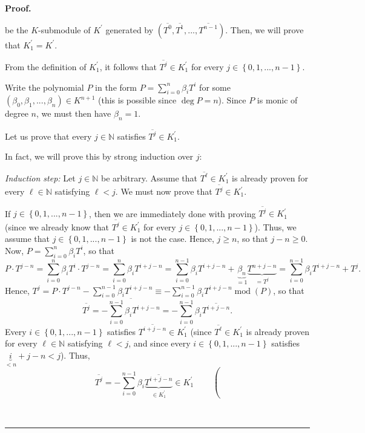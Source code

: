 \documentclass[numbers=enddot,12pt,final,onecolumn,notitlepage]{scrartcl}%
\newenvironment{proof}[1][Proof]{\noindent\textbf{#1.} }{\ \rule{0.5em}{0.5em}}
\begin{document}
\begin{proof}
{be the $K$-submodule of $K^{\prime}$ generated by $\left(  \overline{T^{0}%
},\overline{T^{1}},...,\overline{T^{n-1}}\right)  $. Then, we will prove that
$K_{1}^{\prime}=K^{\prime}$.
\par
From the definition of $K_{1}^{\prime}$, it follows that $\overline{T^{j}}\in
K_{1}^{\prime}$ for every $j\in\left\{  0,1,...,n-1\right\}  $.
\par
Write the polynomial $P$ in the form $P=\sum\limits_{i=0}^{n}\beta_{i}T^{i}$
for some $\left(  \beta_{0},\beta_{1},...,\beta_{n}\right)  \in K^{n+1}$ (this
is possible since $\deg P=n$). Since $P$ is monic of degree $n$, we must then
have $\beta_{n}=1$.
\par
Let us prove that every $j\in\mathbb{N}$ satisfies $\overline{T^{j}}\in
K_{1}^{\prime}$.
\par
In fact, we will prove this by strong induction over $j$:
\par
\textit{Induction step:} Let $j\in\mathbb{N}$ be arbitrary. Assume that
$\overline{T^{\ell}}\in K_{1}^{\prime}$ is already proven for every $\ell
\in\mathbb{N}$ satisfying $\ell<j$. We must now prove that $\overline{T^{j}%
}\in K_{1}^{\prime}$.
\par
If $j\in\left\{  0,1,...,n-1\right\}  $, then we are immediately done with
proving $\overline{T^{j}}\in K_{1}^{\prime}$ (since we already know that
$\overline{T^{j}}\in K_{1}^{\prime}$ for every $j\in\left\{
0,1,...,n-1\right\}  $). Thus, we assume that $j\in\left\{
0,1,...,n-1\right\}  $ is not the case. Hence, $j\geq n$, so that $j-n\geq0$.
Now, $P=\sum\limits_{i=0}^{n}\beta_{i}T^{i}$, so that%
\[
P\cdot T^{j-n}=\sum\limits_{i=0}^{n}\beta_{i}T^{i}\cdot T^{j-n}=\sum
\limits_{i=0}^{n}\beta_{i}T^{i+j-n}=\sum\limits_{i=0}^{n-1}\beta_{i}%
T^{i+j-n}+\underbrace{\beta_{n}}_{=1}\underbrace{T^{n+j-n}}_{=T^{j}}%
=\sum\limits_{i=0}^{n-1}\beta_{i}T^{i+j-n}+T^{j}.
\]
Hence, $T^{j}=P\cdot T^{j-n}-\sum\limits_{i=0}^{n-1}\beta_{i}T^{i+j-n}%
\equiv-\sum\limits_{i=0}^{n-1}\beta_{i}T^{i+j-n}\operatorname{mod}\left(
P\right)  $, so that%
\[
\overline{T^{j}}=\overline{-\sum\limits_{i=0}^{n-1}\beta_{i}T^{i+j-n}}%
=-\sum\limits_{i=0}^{n-1}\beta_{i}\overline{T^{i+j-n}}.
\]
Every $i\in\left\{  0,1,...,n-1\right\}  $ satisfies $\overline{T^{i+j-n}}\in
K_{1}^{\prime}$ (since $\overline{T^{\ell}}\in K_{1}^{\prime}$ is already
proven for every $\ell\in\mathbb{N}$ satisfying $\ell<j$, and since every
$i\in\left\{  0,1,...,n-1\right\}  $ satisfies $\underbrace{i}_{<n}+j-n<j$).
Thus,%
\[
\overline{T^{j}}=-\sum\limits_{i=0}^{n-1}\beta_{i}\underbrace{\overline
{T^{i+j-n}}}_{\in K_{1}^{\prime}}\in K_{1}^{\prime}\ \ \ \ \ \ \ \ \ \ \left(
\]}
\end{proof}
\end{document}
